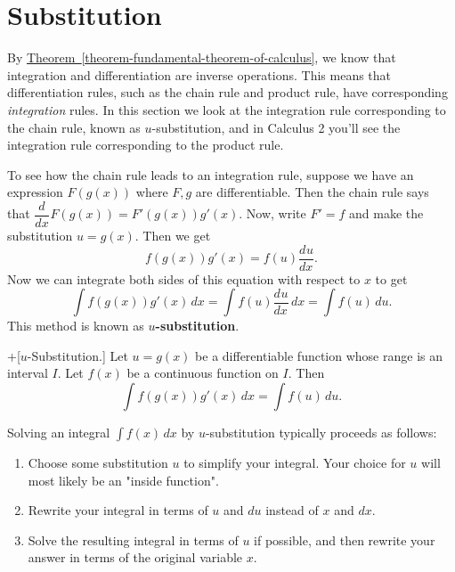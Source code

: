 \documentclass[10pt,]{book}
\newcommand{\terminology}[1]{\textbf{#1}}
\theoremstyle{ptxplainnotitle}
\theoremstyle{ptxplaintitle}
\theoremstyle{ptxplainnotitle}
\theoremstyle{ptxplaintitle}
\theoremstyle{ptxplainnotitle}
\theoremstyle{ptxplaintitle}
\theoremstyle{ptxdefinitionnotitle}
\theoremstyle{ptxdefinitiontitle}
\theoremstyle{ptxdefinitionnotitle}
\theoremstyle{ptxdefinitiontitle}
\theoremstyle{ptxdefinitionnotitle}
\theoremstyle{ptxdefinitiontitle}
\theoremstyle{ptxdefinitionnotitle}
\theoremstyle{ptxdefinitiontitle}
\theoremstyle{ptxdefinitionnotitle}
\theoremstyle{ptxdefinitiontitle}
\numberwithin{equation}{section}
\newcommand{\dv}[3][]{\dfrac{d^{#1} #2}{d #3^{#1}}}
\begin{document}
\section[{Substitution}]{Substitution}\label{section-substitution}
\hypertarget{p-477}{}%
By \hyperref[theorem-fundamental-theorem-of-calculus]{Theorem~\ref{theorem-fundamental-theorem-of-calculus}}, we know that integration and differentiation are inverse operations. This means that differentiation rules, such as the chain rule and product rule, have corresponding \emph{integration} rules. In this section we look at the integration rule corresponding to the chain rule, known as \(u\)-substitution, and in Calculus 2 you'll see the integration rule corresponding to the product rule.%
\par
\hypertarget{p-478}{}%
To see how the chain rule leads to an integration rule, suppose we have an expression \(F(g(x))\) where \(F,g\) are differentiable. Then the chain rule says that \(\dv{}{x}F(g(x)) = F'(g(x))g'(x).\) Now, write \(F' = f\) and make the substitution \(u = g(x)\). Then we get%
\begin{equation*}
f(g(x))g'(x) = f(u)\dv{u}{x}.
\end{equation*}
Now we can integrate both sides of this equation with respect to \(x\) to get%
\begin{equation*}
\int f(g(x))g'(x)\,dx = \int f(u)\dv{u}{x}\,dx = \int f(u)\,du.
\end{equation*}
This method is known as \terminology{\(u\)-substitution}.%
\begin{theorem}+[{\(u\)-Substitution.}]\label{theorem--u--substitution}
\hypertarget{p-479}{}%
Let \(u = g(x)\) be a differentiable function whose range is an interval \(I\). Let \(f(x)\) be a continuous function on \(I\). Then%
\begin{equation*}
\int f(g(x))g'(x)\,dx = \int f(u)\,du.
\end{equation*}
%
\end{theorem}
\hypertarget{p-480}{}%
Solving an integral \(\int f(x)\,dx\) by \(u\)-substitution typically proceeds as follows: \leavevmode%
\begin{enumerate}
\item\hypertarget{li-42}{}Choose some substitution \(u\) to simplify your integral. Your choice for \(u\) will most likely be an "inside function".%
\item\hypertarget{li-43}{}Rewrite your integral in terms of \(u\) and \(du\) instead of \(x\) and \(dx\).%
\item\hypertarget{li-44}{}Solve the resulting integral in terms of \(u\) if possible, and then rewrite your answer in terms of the original variable \(x\).%
\end{enumerate}
\end{document}
